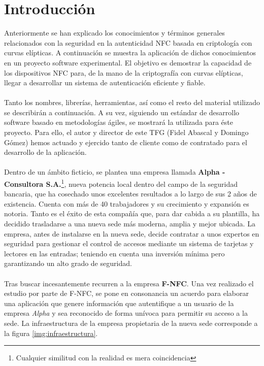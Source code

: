 \documentclass[../PFC.tex]{subfiles}
\begin{document}
\section{Introducción}
\label{App:Introducción}

Anteriormente se han explicado los conocimientos y términos generales relacionados con la seguridad en la autenticidad NFC basada en criptología con curvas elípticas. A continuación se muestra la aplicación de dichos conocimientos en un proyecto software experimental. El objetivo es demostrar la capacidad de los dispositivos NFC para, de la mano de la criptografía con curvas elípticas, llegar a desarrollar un sistema de autenticación eficiente y fiable.
\\\\
Tanto los nombres, librerías, herramientas, así como el resto del material utilizado se describirán a continuación. A su vez, siguiendo un estándar de desarrollo software basado en metodologías ágiles, se mostrará la utilizada para éste proyecto. Para ello,  el autor y director de este TFG (Fidel Abascal y Domingo Gómez) hemos actuado y ejercido tanto de cliente como de contratado para el desarrollo de la aplicación. 
\\\\
Dentro de un ámbito ficticio, se plantea una empresa llamada \textbf{Alpha - Consultora S.A.}\footnote{Cualquier similitud con la realidad es mera coincidencia}, nueva potencia local dentro del campo de la seguridad bancaria, que ha cosechado unos excelentes resultados a lo largo de sus 2 años de existencia. Cuenta con más de 40 trabajadores y su crecimiento y expansión es notoria. Tanto es el éxito de esta compañía que, para dar cabida a su plantilla, ha decidido trasladarse a una nueva sede más moderna, amplia y mejor ubicada. La empresa, antes de instalarse en la nueva sede, decide contratar a unos expertos en seguridad para gestionar el control de accesos mediante un sistema de tarjetas y lectores en las entradas; teniendo en cuenta una inversión mínima pero garantizando un alto grado de seguridad.
\\\\
Tras buscar incesantemente recurren a la empresa \textbf{F-NFC}. Una vez realizado el estudio por parte de F-NFC, se pone en consonancia un acuerdo para elaborar una aplicación que genere información que autentifique a un usuario de la empresa \textit{Alpha} y sea reconocido de forma unívoca para permitir su acceso a la sede. La infraestructura de la empresa propietaria de la nueva sede corresponde a la figura \ref{img:infraestructura}.
\end{document}
